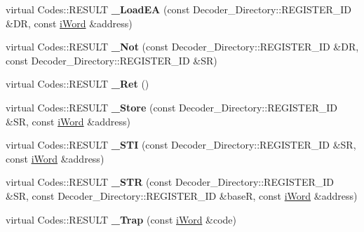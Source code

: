 \begin{DoxyCompactItemize}
\item 
\hypertarget{classWi11_a8b78bd154ed91178ea798bfd83bdc781}{
virtual Codes::RESULT {\bfseries \_\-LoadEA} (const Decoder\_\-Directory::REGISTER\_\-ID \&DR, const \hyperlink{classiWord}{iWord} \&address)}
\label{classWi11_a8b78bd154ed91178ea798bfd83bdc781}

\item 
\hypertarget{classWi11_ad343c78722e67d6bcfa8f5f52c525a97}{
virtual Codes::RESULT {\bfseries \_\-Not} (const Decoder\_\-Directory::REGISTER\_\-ID \&DR, const Decoder\_\-Directory::REGISTER\_\-ID \&SR)}
\label{classWi11_ad343c78722e67d6bcfa8f5f52c525a97}

\item 
\hypertarget{classWi11_a8cbd4e75c8c10f69f4159c02955b4a1f}{
virtual Codes::RESULT {\bfseries \_\-Ret} ()}
\label{classWi11_a8cbd4e75c8c10f69f4159c02955b4a1f}

\item 
\hypertarget{classWi11_ac65b835648a3ecdaa76ceaf49141d3d6}{
virtual Codes::RESULT {\bfseries \_\-Store} (const Decoder\_\-Directory::REGISTER\_\-ID \&SR, const \hyperlink{classiWord}{iWord} \&address)}
\label{classWi11_ac65b835648a3ecdaa76ceaf49141d3d6}

\item 
\hypertarget{classWi11_a914c3e753a0182effc6d01f3de4cdd24}{
virtual Codes::RESULT {\bfseries \_\-STI} (const Decoder\_\-Directory::REGISTER\_\-ID \&SR, const \hyperlink{classiWord}{iWord} \&address)}
\label{classWi11_a914c3e753a0182effc6d01f3de4cdd24}

\item 
\hypertarget{classWi11_ac623d5c7aac534d1eb774892b82c28ec}{
virtual Codes::RESULT {\bfseries \_\-STR} (const Decoder\_\-Directory::REGISTER\_\-ID \&SR, const Decoder\_\-Directory::REGISTER\_\-ID \&baseR, const \hyperlink{classiWord}{iWord} \&address)}
\label{classWi11_ac623d5c7aac534d1eb774892b82c28ec}

\item 
\hypertarget{classWi11_ac62ce0a9f8df8dacab577cee514cb199}{
virtual Codes::RESULT {\bfseries \_\-Trap} (const \hyperlink{classiWord}{iWord} \&code)}
\label{classWi11_ac62ce0a9f8df8dacab577cee514cb199}

\end{DoxyCompactItemize}
